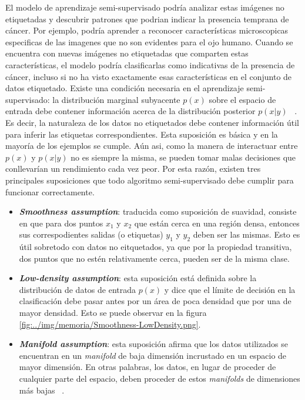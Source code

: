 El modelo de aprendizaje semi-supervisado  podría analizar estas imágenes no etiquetadas y descubrir patrones que podrian indicar la presencia temprana de cáncer. Por ejemplo, podría aprender a reconocer características microscopicas especificas de las imagenes que no son evidentes para el ojo humano. Cuando se encuentra con nuevas imágenes no etiquetadas que comparten estas características, el modelo podría clasificarlas como indicativas de la presencia de cáncer, incluso si no ha visto exactamente esas características en el conjunto de datos etiquetado.
Existe una condición necesaria en el aprendizaje semi-supervisado: la distribución marginal subyacente $p(x)$ sobre el espacio de entrada debe contener información acerca de la distribución posterior $p(x|y)$ ~\cite{Engelen:semi-supervised}. Es decir, la naturaleza de los datos no etiquetados debe contener información útil para inferir las etiquetas correspondientes.
Esta suposición es básica y en la mayoría de los ejemplos se cumple. Aún asi, como la manera de interactuar entre $p(x)$ y  $p(x|y)$ no es siempre la misma, se pueden tomar malas decisiones que conllevarían un rendimiento cada vez peor. Por esta razón, existen tres principales suposiciones que todo algoritmo semi-supervisado debe cumplir para funcionar correctamente.
\begin{itemize}
	\item \textit{\textbf{Smoothness assumption}}: traducida como suposición de suavidad, consiste en que para dos puntos $x_{1}$ y $x_{2}$ que están cerca en una región densa, entonces sus correspodientes salidas (o etiquetas) $y_{1}$ y $y_{2}$ deben ser las mismas. Esto es útil sobretodo con datos no eitquetados, ya que por la propiedad transitiva, dos puntos que no estén relativamente cerca, pueden ser de la misma clase.
	\item \textit{\textbf{Low-density assumption}}: esta suposición está definida sobre la distribución de datos de entrada $p(x)$ y dice que el límite de decisión en la clasificación debe pasar antes por un área de poca densidad que por una de mayor densidad. Esto se puede observar en la figura \ref{fig:../img/memoria/Smoothness-LowDensity.png}.

	
	
	\item \textit{\textbf{Manifold assumption}}: esta suposición afirma que los datos utilizados se encuentran en un \textit{manifold} de baja dimensión incrustado en un espacio de mayor dimensión. En otras palabras, los datos, en lugar de proceder de cualquier parte del espacio, deben proceder de estos \textit{manifolds} de dimensiones más bajas ~\cite{web:assumptions}.
\end{itemize}

